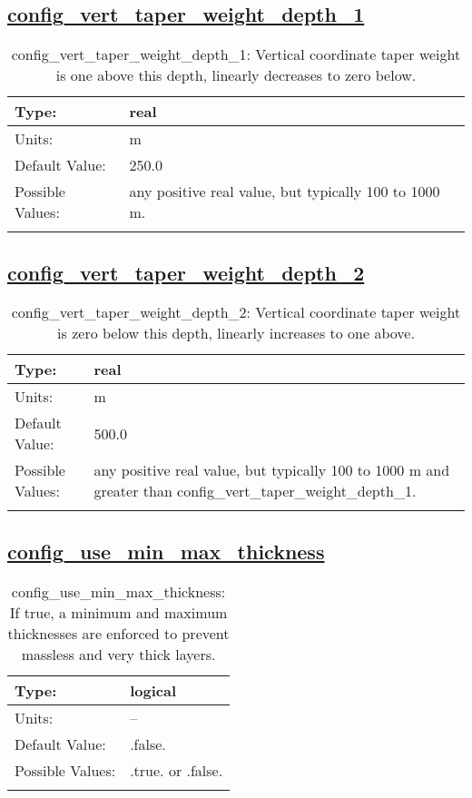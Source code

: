 \subsection[config\_vert\_taper\_weight\_depth\_1]{\hyperref[sec:nm_tab_ALE_vertical_grid]{config\_vert\_taper\_weight\_depth\_1}}
\label{subsec:nm_sec_config_vert_taper_weight_depth_1}
\begin{center}
\begin{longtable}{| p{2.0in} || p{4.0in} |}
    \hline
    Type: & real \\
    \hline
    Units: & \si{m} \\
    \hline
    Default Value: & 250.0 \\
    \hline
    Possible Values: & any positive real value, but typically 100 to 1000 m. \\
    \hline
    \caption{config\_vert\_taper\_weight\_depth\_1: Vertical coordinate taper weight is one above this depth, linearly decreases to zero below.}
\end{longtable}
\end{center}
\subsection[config\_vert\_taper\_weight\_depth\_2]{\hyperref[sec:nm_tab_ALE_vertical_grid]{config\_vert\_taper\_weight\_depth\_2}}
\label{subsec:nm_sec_config_vert_taper_weight_depth_2}
\begin{center}
\begin{longtable}{| p{2.0in} || p{4.0in} |}
    \hline
    Type: & real \\
    \hline
    Units: & \si{m} \\
    \hline
    Default Value: & 500.0 \\
    \hline
    Possible Values: & any positive real value, but typically 100 to 1000 m and greater than config\_vert\_taper\_weight\_depth\_1. \\
    \hline
    \caption{config\_vert\_taper\_weight\_depth\_2: Vertical coordinate taper weight is zero below this depth, linearly increases to one above.}
\end{longtable}
\end{center}
\subsection[config\_use\_min\_max\_thickness]{\hyperref[sec:nm_tab_ALE_vertical_grid]{config\_use\_min\_max\_thickness}}
\label{subsec:nm_sec_config_use_min_max_thickness}
\begin{center}
\begin{longtable}{| p{2.0in} || p{4.0in} |}
    \hline
    Type: & logical \\
    \hline
    Units: & -- \\
    \hline
    Default Value: & .false. \\
    \hline
    Possible Values: & .true. or .false. \\
    \hline
    \caption{config\_use\_min\_max\_thickness: If true, a minimum and maximum thicknesses are enforced to prevent massless and very thick layers.}
\end{longtable}
\end{center}
